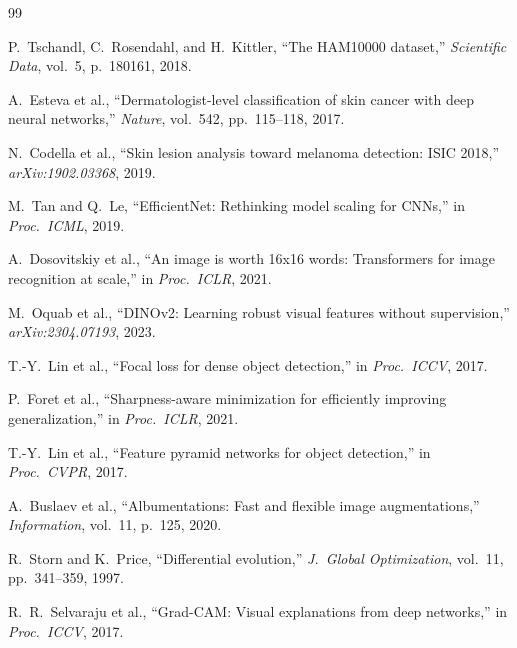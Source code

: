 \documentclass[10pt,twocolumn]{article}
\begin{document}

\begin{thebibliography}{99}

P.~Tschandl, C.~Rosendahl, and H.~Kittler,
``The HAM10000 dataset,''
\textit{Scientific Data}, vol.~5, p.~180161, 2018.

A.~Esteva et al.,
``Dermatologist-level classification of skin cancer with deep neural networks,''
\textit{Nature}, vol.~542, pp.~115--118, 2017.

N.~Codella et al.,
``Skin lesion analysis toward melanoma detection: ISIC 2018,''
\textit{arXiv:1902.03368}, 2019.

M.~Tan and Q.~Le,
``EfficientNet: Rethinking model scaling for CNNs,''
in \textit{Proc.\ ICML}, 2019.

A.~Dosovitskiy et al.,
``An image is worth 16x16 words: Transformers for image recognition at scale,''
in \textit{Proc.\ ICLR}, 2021.

M.~Oquab et al.,
``DINOv2: Learning robust visual features without supervision,''
\textit{arXiv:2304.07193}, 2023.

T.-Y.~Lin et al.,
``Focal loss for dense object detection,''
in \textit{Proc.\ ICCV}, 2017.

P.~Foret et al.,
``Sharpness-aware minimization for efficiently improving generalization,''
in \textit{Proc.\ ICLR}, 2021.

T.-Y.~Lin et al.,
``Feature pyramid networks for object detection,''
in \textit{Proc.\ CVPR}, 2017.

A.~Buslaev et al.,
``Albumentations: Fast and flexible image augmentations,''
\textit{Information}, vol.~11, p.~125, 2020.

R.~Storn and K.~Price,
``Differential evolution,''
\textit{J.\ Global Optimization}, vol.~11, pp.~341--359, 1997.

R.~R.~Selvaraju et al.,
``Grad-CAM: Visual explanations from deep networks,''
in \textit{Proc.\ ICCV}, 2017.

\end{thebibliography}

\end{document}
